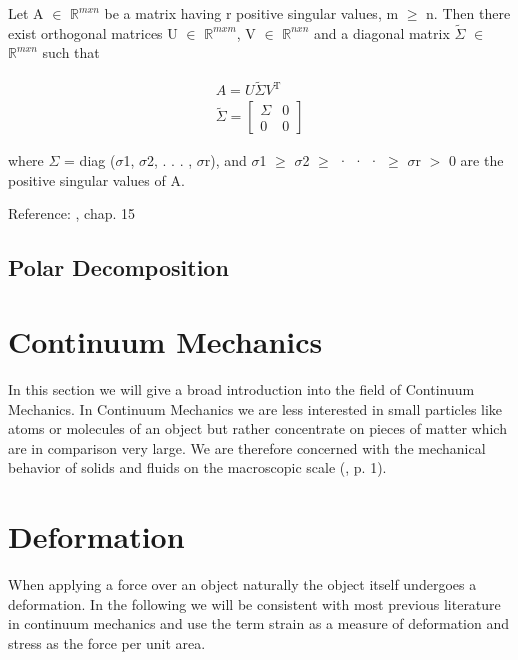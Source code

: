 \begin{theorem}
Let A $\in$ $\mathbb{R}^{m x n}$ be a matrix having r positive singular values, m $\geq$ n. Then there exist orthogonal matrices U $\in$ $\mathbb{R}^{m x m}$, V $\in$ $\mathbb{R}^{n x n}$ and a diagonal matrix $\tilde{\Sigma}$ $\in$ $\mathbb{R}^{m x n}$ such that

\[
\begin{array}{l}{A=U \tilde{\Sigma} V^{\mathrm{T}}} \\ {\tilde{\Sigma}=\left[\begin{array}{ll}{\Sigma} & {0} \\ {0} & {0}\end{array}\right]}\end{array}
\]

where $\Sigma$ = diag ($\sigma$1, $\sigma$2, . . . , $\sigma$r), and $\sigma$1 $\geq$ $\sigma$2 $\geq$ · · · $\geq$ $\sigma$r $>$ 0 are the positive singular values of A.

\end{theorem}
Reference: \cite{ford2014numerical}, chap. 15



\subsection{Polar Decomposition}





\section{Continuum Mechanics}
In this section we will give a broad introduction into the field of Continuum Mechanics. In Continuum Mechanics we are less interested in small particles like atoms or molecules of an object but rather concentrate on pieces of matter which are in comparison very large. We are therefore concerned with the mechanical behavior of solids and fluids on the macroscopic scale (\cite{Spencer1980}, p. 1).


\section{Deformation}
When applying a force over an object naturally the object itself undergoes a deformation. In the following we will be consistent with most previous literature in continuum mechanics and use the term strain as a measure of deformation and stress as the force per unit area.


